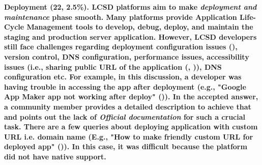 \bf{Deployment (22, 2.5\%).} LCSD platforms aim to make \textit{deployment and maintenance} phase smooth. Many platforms provide Application Life-Cycle Management tools to develop, debug, deploy, and maintain the staging and production server application. However, LCSD developers still face challenges regarding deployment configuration issues (), version control, DNS configuration, performance issues, accessibility issues (i.e., sharing public URL of the application (, )), DNS configuration etc. For example, in this discussion, a developer was having trouble in accessing the app after deployment (e.g., "Google App Maker app not working after deploy" ()). In the accepted answer, a community member provides a detailed description to achieve that and points out the lack of \textit{Official documentation} for such a crucial task. There are a few queries about deploying application with custom URL i.e. domain name (E.g., "How to make friendly custom URL for deployed app" ()). In this case, it was difficult because the platform did not have native support. 








